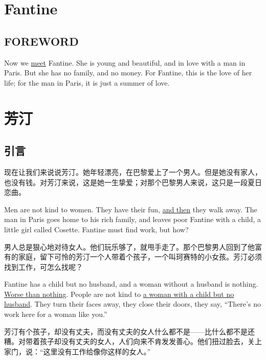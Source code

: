 \documentclass[fontset=ubuntu, zihao=5]{ctexart}
\begin{document}
\clearpage
\begin{paracol}{2}

  \section{Fantine}

  \subsection*{FOREWORD}

  Now we \uline{meet} Fantine. She is young and beautiful, and in love with
  a man in Paris. But she has no family, and no money. For Fantine, this is
  the love of her life; for the man in Paris, it is just a summer of love.

  \switchcolumn

  \section*{芳汀}

  \subsection*{引言}


  现在让我们来说说芳汀。她年轻漂亮，在巴黎爱上了一个男人。但是她没有家人，也没有钱。对芳汀来说，这是她一生挚爱；对那个巴黎男人来说，这只是一段夏日恋曲。

  \switchcolumn*

  Men are not kind to women. They have their fun, \uline{and then} they walk away. The man in Paris goes home to his rich family, and leaves poor Fantine with a child, a little girl called Cosette. Fantine must find work, but how?

  \switchcolumn

  男人总是狠心地对待女人。他们玩乐够了，就甩手走了。那个巴黎男人回到了他富有的家庭，留下可怜的芳汀一个人带着个孩子，一个叫珂赛特的小女孩。芳汀必须找到工作，可怎么找呢？

  \switchcolumn*

  Fantine has a child but no husband, and a woman without a husband is
  nothing. \uline{Worse than nothing}. People are not kind to \uline{a woman
    with a child but no husband}. They turn their faces away, they close
  their doors, they say, ``There's no work here for a woman like you.''

  \switchcolumn

  芳汀有个孩子，却没有丈夫，而没有丈夫的女人什么都不是——比什么都不是还糟。对带着孩子却没有丈夫的女人，人们向来不肯发发善心。他们扭过脸去，关上家门，说：“这里没有工作给像你这样的女人。”


\end{paracol}
\end{document}
